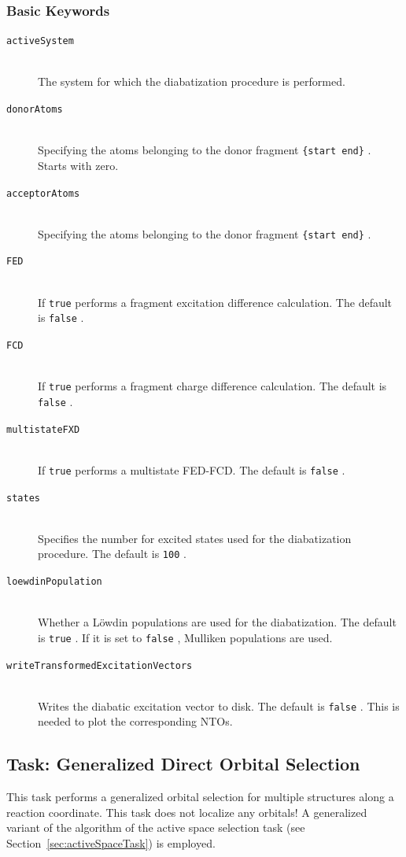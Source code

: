 \documentclass[bibliography=totocnumbered,a4paper,10pt,oneside]{scrbook}
\newcommand{\ttt}[1]{%
  \begingroup\setlength{\fboxsep}{1pt}%
  \colorbox{serenity-green!30}{\texttt{\hspace*{2pt}\vphantom{(g}#1\hspace*{2pt}}}%
  \endgroup
}
\begin{document}
\subsubsection{Basic Keywords}
\begin{description}
	\item [\texttt{activeSystem}]\hfill \\
	The system for which the diabatization procedure is performed.
	\item [\texttt{donorAtoms}]\hfill \\
	Specifying the atoms belonging to the donor fragment \ttt{\{start end\}}. Starts with zero. 
	\item [\texttt{acceptorAtoms}]\hfill \\
	Specifying the atoms belonging to the donor fragment \ttt{\{start end\}}. 
	\item [\texttt{FED}]\hfill \\
	If \texttt{true} performs a fragment excitation difference calculation. The default is \ttt{false}.
	\item [\texttt{FCD}]\hfill \\
	If \texttt{true} performs a fragment charge difference calculation. The default is \ttt{false}.
	\item [\texttt{multistateFXD}]\hfill \\
	If \texttt{true} performs a multistate FED-FCD. The default is \ttt{false}.
	\item [\texttt{states}]\hfill \\
  Specifies the number for excited states used for the diabatization procedure. The default is \ttt{100}.
	\item [\texttt{loewdinPopulation}]\hfill \\
	Whether a Löwdin populations are used for the diabatization. The default is \ttt{true}. If it is set to \ttt{false}, Mulliken populations are used.
	\item [\texttt{writeTransformedExcitationVectors}]\hfill \\
	Writes the diabatic excitation vector to disk. The default is \ttt{false}. This is needed to plot the corresponding NTOs.
\end{description}

\subsection{Task: Generalized Direct Orbital Selection\label{task:gdos}}
This task performs a generalized orbital selection for multiple structures along a reaction coordinate.
This task does not localize any orbitals! A generalized variant of the algorithm of
the active space selection task (see Section~\ref{sec:activeSpaceTask}) is employed.
\end{document}
